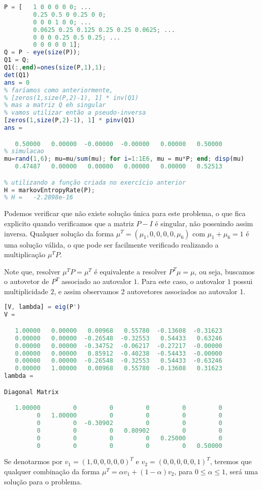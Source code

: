 \begin{questions}
\begin{solution}
\begin{lstlisting}[language=Octave]
P = [   1 0 0 0 0 0; ...
        0.25 0.5 0 0.25 0 0; 
        0 0 0 1 0 0; ...
        0.0625 0.25 0.125 0.25 0.25 0.0625; ...
        0 0 0 0.25 0.5 0.25; ...
        0 0 0 0 0 1];
Q = P - eye(size(P));
Q1 = Q;
Q1(:,end)=ones(size(P,1),1);
det(Q1)
ans = 0
% faríamos como anteriormente, 
% [zeros(1,size(P,2)-1), 1] * inv(Q1)
% mas a matriz Q eh singular
% vamos utilizar então a pseudo-inversa
[zeros(1,size(P,2)-1), 1] * pinv(Q1)
ans =

   0.50000   0.00000  -0.00000  -0.00000   0.00000   0.50000
% simulacao
mu=rand(1,6); mu=mu/sum(mu); for i=1:1E6, mu = mu*P; end; disp(mu)
   0.47487   0.00000   0.00000   0.00000   0.00000   0.52513

% utilizando a função criada no exercício anterior
H = markovEntropyRate(P);
% H =   -2.2898e-16
\end{lstlisting}

Podemos verificar que não existe solução única para este problema,
o que fica explicito quando verificamos que a matriz $P-I$
é singular, não possuindo assim inversa.
Qualquer solução da forma $\mu^T = (\mu_1, 0, 0, 0, 0, \mu_6)$
com $\mu_1 + \mu_6 = 1$ é uma solução válida, o que pode ser
facilmente verificado realizando a multiplicação $\mu^T P$.


Note que, resolver $\mu^T P = \mu^T$ é equivalente a resolver $P^T \mu = \mu$,
ou seja, buscamos o autovetor de $P^T$ associado ao autovalor $1$.
Para este caso, o autovalor $1$ possui multiplicidade $2$, e assim
observamos 2 autovetores associados ao autovalor 1.
\begin{lstlisting}[language=Octave]
[V, lambda] = eig(P')
V =

   1.00000   0.00000   0.00968   0.55780  -0.13608  -0.31623
   0.00000   0.00000  -0.26548  -0.32553   0.54433   0.63246
   0.00000   0.00000  -0.34752  -0.06217  -0.27217  -0.00000
   0.00000   0.00000   0.85912  -0.40238  -0.54433  -0.00000
   0.00000   0.00000  -0.26548  -0.32553   0.54433  -0.63246
   0.00000   1.00000   0.00968   0.55780  -0.13608   0.31623
lambda =

Diagonal Matrix

   1.00000         0         0         0         0         0
         0   1.00000         0         0         0         0
         0         0  -0.30902         0         0         0
         0         0         0   0.80902         0         0
         0         0         0         0   0.25000         0
         0         0         0         0         0   0.50000
\end{lstlisting}
Se denotarmos por $v_1 = (1,0,0,0,0,0)^T$ e $v_2 = (0,0,0,0,0,1)^T$,
teremos que qualquer combinação da forma $\mu^T = \alpha v_1 + (1-\alpha)v_2$,
para $0 \leq \alpha \leq 1$, será uma solução para o problema.



\end{solution}
\end{questions}
